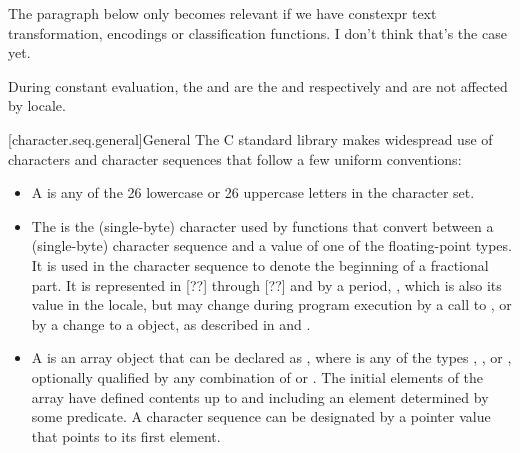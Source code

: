 \documentclass{wg21}
\begin{document}
\begin{quoteblock}
The paragraph below only becomes relevant if we have constexpr text transformation, encodings or classification functions.
I don't think that's the case yet.
\end{quoteblock}

\begin{addedblock}
During constant evaluation, the  and  are the  and  respectively and are not affected by locale.

\end{addedblock}

[character.seq.general]{General}
\pnum
The C standard library makes widespread use
%
of characters and character sequences that follow a few uniform conventions:

\begin{itemize}
    \item
    A  is any of the 26 lowercase or 26
    uppercase letters in the  character set.
    \item
    The
    is the
    (single-byte) character used by functions that convert between a (single-byte)
    character sequence and a value of one of the floating-point types.
    It is used
    in the character sequence to denote the beginning of a fractional part.
    It is
    represented in [??] through  [??]
    and  by a period,
    ,
    which is
    also its value in the 
    locale, but may change during program
    execution by a call to
    ,
    or by a change to a
    object, as described in  and .
    \item
    A
    is an array object  that
    can be declared as
    ,
    where  is any of the types
    ,
    ,
    or
    , optionally qualified by any combination of
    or
    .
    The initial elements of the
    array have defined contents up to and including an element determined by some
    predicate.
    A character sequence can be designated by a pointer value
     that points to its first element.
\end{itemize}
\end{document}
